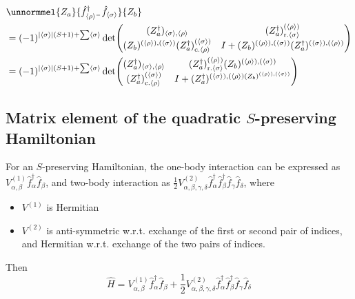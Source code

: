 \documentclass[12pt]{article}
\newcommand{\seq}[1]{\langle #1\rangle}
\newcommand{\hc}{^\dagger}
\begin{document}
	\begin{align}
	&\unnormmel{Z_a}{\hat{f}\hc_{\seq{\rho}^-}\hat{f}_{\seq{\sigma}}}{Z_b} \nonumber\\
	&= (-1)^{\abs{\seq{\sigma}}(S+1)+\sum\seq{\sigma}}\det(\mqty{
		(Z_a\hc)_{\seq{\sigma},\seq{\rho}} & (Z_a\hc)^{(\seq{\rho})}_{\text{r.} \seq{\sigma}}\\
		(Z_b)^{(\seq{\rho}),(\seq{\sigma})}(Z_a\hc)^{(\seq{\sigma})}_{\text{c.} \seq{\rho}} & I+(Z_b)^{(\seq{\rho}),(\seq{\sigma})}(Z_a\hc)^{(\seq{\sigma}),(\seq{\rho})}
	})\\
	&= (-1)^{\abs{\seq{\sigma}}(S+1)+\sum\seq{\sigma}}\det(\mqty{
		(Z_a\hc)_{\seq{\sigma},\seq{\rho}} & (Z_a\hc)^{(\seq{\rho})}_{\text{r.} \seq{\sigma}}(Z_b)^{(\seq{\rho}),(\seq{\sigma})}\\
		(Z_a\hc)^{(\seq{\sigma})}_{\text{c.} \seq{\rho}} & I+(Z_a\hc)^{(\seq{\sigma}),(\seq{\rho})(Z_b)^{(\seq{\rho}),(\seq{\sigma})}}
	})
	\end{align}
	 
	
	\subsection{Matrix element of the quadratic $S$-preserving Hamiltonian}
	For an $S$-preserving Hamiltonian, the one-body interaction can be expressed as $V^{(1)}_{\alpha,\beta}\hat{f}\hc_\alpha\hat{f}_\beta$, and two-body interaction as $\frac{1}{2}V^{(2)}_{\alpha,\beta,\gamma,\delta}\hat{f}\hc_\alpha\hat{f}\hc_\beta\hat{f}_\gamma\hat{f}_\delta$, where
	\begin{itemize}
	\item $V^{(1)}$ is Hermitian
	\item $V^{(2)}$ is anti-symmetric w.r.t. exchange of the first or second pair of indices, and Hermitian w.r.t. exchange of the two pairs of indices.
	\end{itemize}
	Then
	\begin{equation}
	\hat{H}=V^{(1)}_{\alpha,\beta}\hat{f}\hc_\alpha\hat{f}_\beta+\frac{1}{2}V^{(2)}_{\alpha,\beta,\gamma,\delta}\hat{f}\hc_\alpha\hat{f}\hc_\beta\hat{f}_\gamma\hat{f}_\delta
	\end{equation}
	
	\appendix
	
\end{document}
